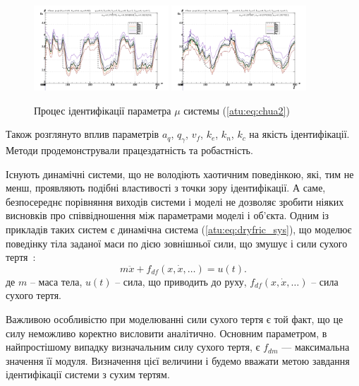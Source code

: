 \documentclass[a4paper,13pt]{atuaref}
\begin{document}
\begin{figure}[htb!]
\centerline{
  \includegraphics[width=0.45\textwidth]{p5/p/cha/chua/chua_m5p-pl_n_sign.png}
  \includegraphics[width=0.45\textwidth]{p5/p/cha/chua/chua_m5p-pl_n_sin.png}
}
\caption{Процес ідентифікації параметра $\mu$ системы (\ref{atu:eq:chua2})
}
\label{atu:f:chua_id}
\end{figure}

Також розглянуто вплив параметрів $a_q$, $q_\gamma$, $v_f$, $k_e$, $k_n$, $k_c$
на якість ідентифікації. Методи
продемонстрували працездатність та робастність.


Існують динамічні системи, що не володіють хаотичним поведінкою, які, тим не
менш, проявляють подібні властивості з точки зору ідентифікації. А саме,
безпосереднє порівняння виходів системи і моделі не дозволяє зробити ніяких
висновків про співвідношення між параметрами моделі і об'єкта. Одним із
прикладів таких систем є динамічна система (\ref{atu:eq:dryfric_sys}), що
моделює поведінку тіла заданої маси по дією зовнішньої сили, що змушує і сили
сухого тертя~\cite{atu_asau11}:
%
\begin{equation}
  m \ddot{x} + f_{df}( x, \dot{x}, \ldots)  = u(t).
\label{atu:eq:dryfric_sys}
\end{equation}
%
де
$m$ -- маса тела,
$u(t)$ -- сила, що приводить до руху,
$ f_{df}( x, \dot{x}, \ldots)  $ -- сила сухого тертя.

Важливою особливістю при моделюванні сили сухого тертя є той факт, що це силу
неможливо коректно висловити аналітично. Основним параметром, в найпростішому
випадку визначальним силу сухого тертя, є $f_{dm} $ --- максимальна значення її
модуля. Визначення цієї величини і будемо вважати метою завдання ідентифікації
системи з сухим тертям.
\end{document}

